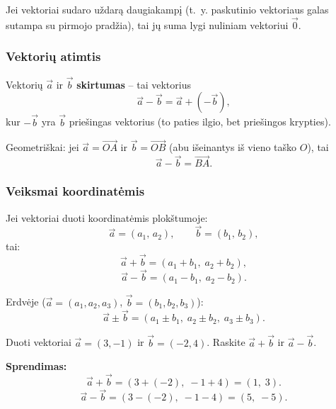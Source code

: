\begin{remark}
Jei vektoriai sudaro uždarą daugiakampį (t.~y. paskutinio vektoriaus galas sutampa su
pirmojo pradžia), tai jų suma lygi nuliniam vektoriui $\vec{0}$.
\end{remark}

\subsubsection*{Vektorių atimtis}

\begin{definition}
Vektorių $\vec{a}$ ir $\vec{b}$ \textbf{skirtumas} – tai vektorius
\[
  \vec{a} - \vec{b} = \vec{a} + (-\vec{b}),
\]
kur $-\vec{b}$ yra $\vec{b}$ priešingas vektorius (to paties ilgio, bet priešingos krypties).
\end{definition}

Geometriškai: jei $\vec{a} = \overrightarrow{OA}$ ir $\vec{b} = \overrightarrow{OB}$ (abu išeinantys
iš vieno taško $O$), tai
\[
  \vec{a} - \vec{b} = \overrightarrow{BA}.
\]

\begin{center}
\end{center}

\subsubsection*{Veiksmai koordinatėmis}

Jei vektoriai duoti koordinatėmis plokštumoje:
\[
  \vec{a} = (a_1,\, a_2), \qquad \vec{b} = (b_1,\, b_2),
\]
tai:
\[
  \vec{a} + \vec{b} = (a_1 + b_1,\; a_2 + b_2),
\]
\[
  \vec{a} - \vec{b} = (a_1 - b_1,\; a_2 - b_2).
\]

Erdvėje ($\vec{a} = (a_1, a_2, a_3)$, $\vec{b} = (b_1, b_2, b_3)$):
\[
  \vec{a} \pm \vec{b} = (a_1 \pm b_1,\; a_2 \pm b_2,\; a_3 \pm b_3).
\]

\begin{example}
Duoti vektoriai $\vec{a} = (3, -1)$ ir $\vec{b} = (-2, 4)$. Raskite
$\vec{a} + \vec{b}$ ir $\vec{a} - \vec{b}$.

\textbf{Sprendimas:}
\[
  \vec{a} + \vec{b} = (3 + (-2),\; -1 + 4) = (1,\; 3).
\]
\[
  \vec{a} - \vec{b} = (3 - (-2),\; -1 - 4) = (5,\; -5).
\]
\end{example}

